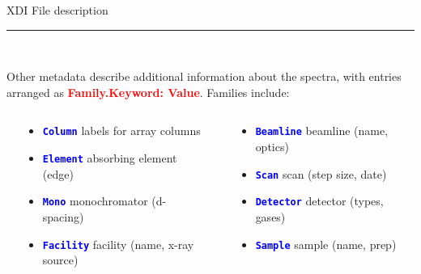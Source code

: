 \documentclass[final]{beamer}
\newcommand{\Color}[2]{{\textcolor{#1}{#2}}}
\newcommand{\BoldRed}[1]{{\Color{Red}{\bf{#1}}}}
\newcommand{\Blue}[1]{{\Color{Blue}{\bf{#1}}}}
\begin{document}
\begin{frame}{}
\begin{columns}[t]
\begin{column}{.44\linewidth}
\begin{block}{\large XDI File description}
         \vspace{3mm}

         \hrule

         \vspace{3mm} {\ }

         \justifying
         Other metadata describe additional information about the spectra, with
         entries arranged as {\BoldRed{{Family.Keyword: Value}}}.  Families include:

         \begin{columns}[T]
           \begin{column}{0.02\linewidth}
           \end{column}
           \begin{column}{0.46\linewidth}
             \begin{itemize}
             \item {\Blue{\tt{Column}}}   labels for array columns
             \item {\Blue{\tt{Element}}}  absorbing element (edge)
             \item {\Blue{\tt{Mono}}}     monochromator (d-spacing)
             \item {\Blue{\tt{Facility}}} facility  (name, x-ray source)
           \end{itemize}
           \end{column}
           \begin{column}{0.02\linewidth}
           \end{column}
           \begin{column}{0.46\linewidth}
             \begin{itemize}
             \item {\Blue{\tt{Beamline}}} beamline  (name, optics)
             \item {\Blue{\tt{Scan}}}     scan  (step size, date)
             \item {\Blue{\tt{Detector}}} detector (types, gases)
             \item {\Blue{\tt{Sample}}}   sample (name, prep)
           \end{itemize}

           \end{column}
           \begin{column}{0.02\linewidth}
           \end{column}

         \end{columns}


\end{block}
\end{column}
\end{columns}
\end{frame}
\end{document}
